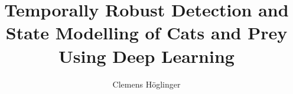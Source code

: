 \documentclass[type=bachelor,degree=engineering,theme=default,language=english,titlelanguage=english,smartquotes=true]{hgbthesis}
\begin{document}
\title{Temporally Robust Detection and State Modelling of Cats and Prey Using Deep Learning}
\author{Clemens Höglinger}

\frontmatter
\maketitle

\tableofcontents

		
			

\mainmatter










\backmatter

\MakeBibliography
\end{document}
